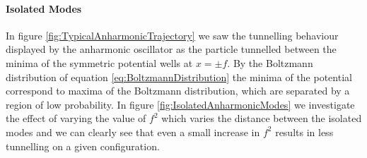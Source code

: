 \documentclass[12pt]{article}
\begin{document}
            \paragraph{Isolated Modes}
                In figure \ref{fig:TypicalAnharmonicTrajectory} we saw the tunnelling behaviour displayed by the anharmonic oscillator as the particle tunnelled between the minima of the symmetric potential wells at $x=\pm f$. By the Boltzmann distribution of equation \ref{eq:BoltzmannDistribution} the minima of the potential correspond to maxima of the Boltzmann distribution, which are separated by a region of low probability. In figure \ref{fig:IsolatedAnharmonicModes} we investigate the effect of varying the value of $f^2$ which varies the distance between the isolated modes and we can clearly see that even a small increase in $f^2$ results in less tunnelling on a given configuration. 
\end{document}
